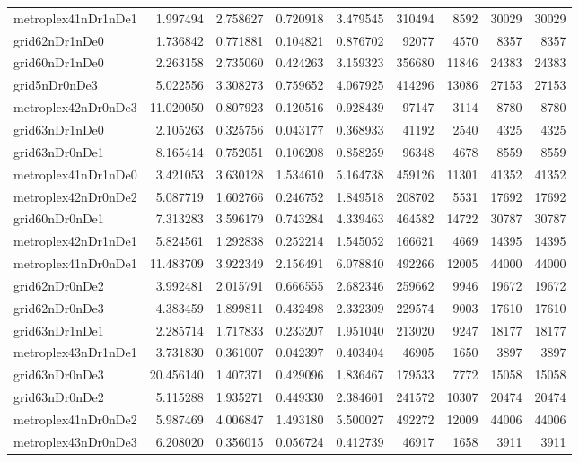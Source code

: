 \begin{longtable}{|l|r|r|r|r|r|r|r|r|}
metroplex41nDr1nDe1 & 1.997494 & 2.758627 & 0.720918 & 3.479545 & 310494 & 8592 & 30029 & 30029 \\
grid62nDr1nDe0 & 1.736842 & 0.771881 & 0.104821 & 0.876702 & 92077 & 4570 & 8357 & 8357 \\
grid60nDr1nDe0 & 2.263158 & 2.735060 & 0.424263 & 3.159323 & 356680 & 11846 & 24383 & 24383 \\
grid5nDr0nDe3 & 5.022556 & 3.308273 & 0.759652 & 4.067925 & 414296 & 13086 & 27153 & 27153 \\
metroplex42nDr0nDe3 & 11.020050 & 0.807923 & 0.120516 & 0.928439 & 97147 & 3114 & 8780 & 8780 \\
grid63nDr1nDe0 & 2.105263 & 0.325756 & 0.043177 & 0.368933 & 41192 & 2540 & 4325 & 4325 \\
grid63nDr0nDe1 & 8.165414 & 0.752051 & 0.106208 & 0.858259 & 96348 & 4678 & 8559 & 8559 \\
metroplex41nDr1nDe0 & 3.421053 & 3.630128 & 1.534610 & 5.164738 & 459126 & 11301 & 41352 & 41352 \\
metroplex42nDr0nDe2 & 5.087719 & 1.602766 & 0.246752 & 1.849518 & 208702 & 5531 & 17692 & 17692 \\
grid60nDr0nDe1 & 7.313283 & 3.596179 & 0.743284 & 4.339463 & 464582 & 14722 & 30787 & 30787 \\
metroplex42nDr1nDe1 & 5.824561 & 1.292838 & 0.252214 & 1.545052 & 166621 & 4669 & 14395 & 14395 \\
metroplex41nDr0nDe1 & 11.483709 & 3.922349 & 2.156491 & 6.078840 & 492266 & 12005 & 44000 & 44000 \\
grid62nDr0nDe2 & 3.992481 & 2.015791 & 0.666555 & 2.682346 & 259662 & 9946 & 19672 & 19672 \\
grid62nDr0nDe3 & 4.383459 & 1.899811 & 0.432498 & 2.332309 & 229574 & 9003 & 17610 & 17610 \\
grid63nDr1nDe1 & 2.285714 & 1.717833 & 0.233207 & 1.951040 & 213020 & 9247 & 18177 & 18177 \\
metroplex43nDr1nDe1 & 3.731830 & 0.361007 & 0.042397 & 0.403404 & 46905 & 1650 & 3897 & 3897 \\
grid63nDr0nDe3 & 20.456140 & 1.407371 & 0.429096 & 1.836467 & 179533 & 7772 & 15058 & 15058 \\
grid63nDr0nDe2 & 5.115288 & 1.935271 & 0.449330 & 2.384601 & 241572 & 10307 & 20474 & 20474 \\
metroplex41nDr0nDe2 & 5.987469 & 4.006847 & 1.493180 & 5.500027 & 492272 & 12009 & 44006 & 44006 \\
metroplex43nDr0nDe3 & 6.208020 & 0.356015 & 0.056724 & 0.412739 & 46917 & 1658 & 3911 & 3911 \\

\end{longtable}
